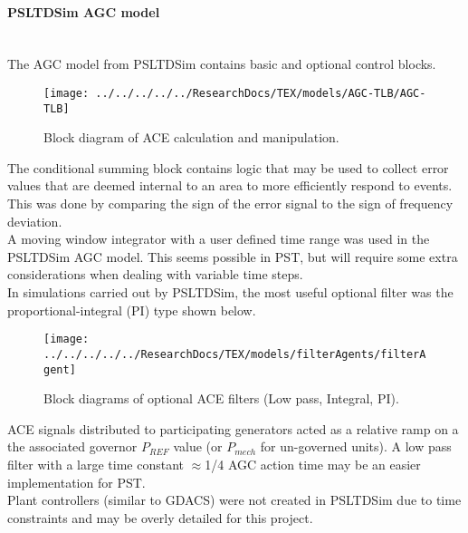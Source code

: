 \documentclass[12pt]{article}
\begin{document}
\pagebreak
\paragraph{PSLTDSim AGC model} \ \\
The AGC model from PSLTDSim contains basic and optional control blocks. 
\begin{figure}[!ht]
	\centering
	\footnotesize
	\texttt{[image: ../../../../../ResearchDocs/TEX/models/AGC-TLB/AGC-TLB]}
	\caption{Block diagram of ACE calculation and manipulation.}
	\label{fig: AGC-TLB}
\end{figure}%


The conditional summing block contains logic that may be used to collect error values that are deemed internal to an area to more efficiently respond to events.
This was done by comparing the sign of the error signal to the sign of frequency deviation.\\
 
A moving window integrator with a user defined time range was used in the PSLTDSim AGC model. 
This seems possible in PST, but will require some extra considerations when dealing with variable time steps.\\

In simulations carried out by PSLTDSim, the most useful optional filter was the proportional-integral (PI) type shown below.
\begin{figure}[!ht]
	\centering
	\footnotesize
	\texttt{[image: ../../../../../ResearchDocs/TEX/models/filterAgents/filterAgent]}
	\caption{Block diagrams of optional ACE filters (Low pass, Integral, PI).}
	\label{fig: filterAgents}
\end{figure}%


ACE signals distributed to participating generators acted as a relative ramp on a the associated governor $P_{REF}$ value (or $P_{mech}$ for un-governed units).
A low pass filter with a large time constant $\approx$1/4  AGC action time may be an easier implementation for PST.\\

Plant controllers (similar to GDACS) were not created in PSLTDSim due to time constraints and may be overly detailed for this project.
\end{document}
